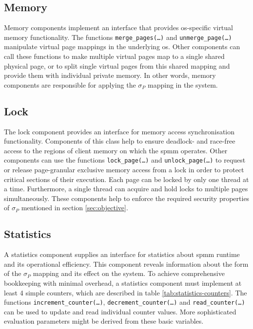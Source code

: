 \subsection*{Memory}
\label{subsec:Memory}

Memory components implement an interface that provides \ac{os}-specific virtual memory functionality.
The functions \texttt{merge\_pages(\ldots)} and \texttt{unmerge\_page(\ldots)} manipulate virtual page mappings in the underlying \ac{os}.
Other components can call these functions to make multiple virtual pages map to a single shared physical page, or to split single virtual pages from this shared mapping and provide them with individual private memory.
In other words, memory components are responsible for applying the $\sigma_P$ mapping in the system.

\subsection*{Lock}
\label{subsec:Lock}

The lock component provides an interface for memory access synchronisation functionality.
Components of this class help to ensure deadlock- and race-free access to the regions of client memory on which the \ac{spmm} operates.
Other components can use the functions \texttt{lock\_page(\ldots)} and \texttt{unlock\_page(\ldots)} to request or release page-granular exclusive memory access from a lock in order to protect critical sections of their execution.
Each page can be locked by only one thread at a time.
Furthermore, a single thread can acquire and hold locks to multiple pages simultaneously.
These components help to enforce the required security properties of $\sigma_P$ mentioned in section \ref{sec:objective}.

\subsection*{Statistics}
\label{subsec:statistics}

A statistics component supplies an interface for statistics about \ac{spmm} runtime and its operational efficiency.
This component reveals information about the form of the $\sigma_P$ mapping and its effect on the system.
To achieve comprehensive bookkeeping with minimal overhead, a statistics component must implement at least 4 simple counters, which are described in table \ref{tab:statistics-counters}.
The functions \texttt{increment\_counter(\ldots)}, \texttt{decrement\_counter(\ldots)} and \texttt{read\_counter(\ldots)} can be used to update and read individual counter values.
More sophisticated evaluation parameters might be derived from these basic variables.

